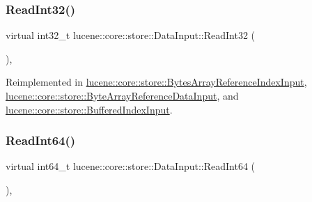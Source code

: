 \mbox{\label{classlucene_1_1core_1_1store_1_1DataInput_a1be184e66e0bf1f9f948e758429d1ed5}} 
\subsubsection{\texorpdfstring{Read\+Int32()}{ReadInt32()}}
{\footnotesize\ttfamily virtual int32\+\_\+t lucene\+::core\+::store\+::\+Data\+Input\+::\+Read\+Int32 (\begin{DoxyParamCaption}{ }\end{DoxyParamCaption})\hspace{0.3cm}{\ttfamily [inline]}, {\ttfamily [virtual]}}



Reimplemented in \mbox{\hyperlink{classlucene_1_1core_1_1store_1_1BytesArrayReferenceIndexInput_a3b2a098ccf0748f67d88cf8050c07a5e}{lucene\+::core\+::store\+::\+Bytes\+Array\+Reference\+Index\+Input}}, \mbox{\hyperlink{classlucene_1_1core_1_1store_1_1ByteArrayReferenceDataInput_a03f2d5ee9d204ec1afcc60d908debf60}{lucene\+::core\+::store\+::\+Byte\+Array\+Reference\+Data\+Input}}, and \mbox{\hyperlink{classlucene_1_1core_1_1store_1_1BufferedIndexInput_a9e4dfe35550c492c8cbcb412a39f08e7}{lucene\+::core\+::store\+::\+Buffered\+Index\+Input}}.

\mbox{\label{classlucene_1_1core_1_1store_1_1DataInput_a60310365f3d2d4e7b9dda79b00cc355b}} 
\subsubsection{\texorpdfstring{Read\+Int64()}{ReadInt64()}}
{\footnotesize\ttfamily virtual int64\+\_\+t lucene\+::core\+::store\+::\+Data\+Input\+::\+Read\+Int64 (\begin{DoxyParamCaption}{ }\end{DoxyParamCaption})\hspace{0.3cm}{\ttfamily [inline]}, {\ttfamily [virtual]}}



